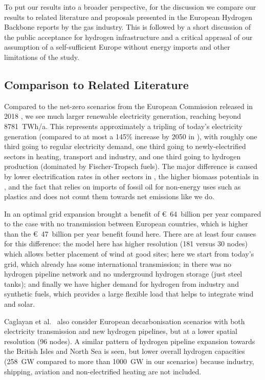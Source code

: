 To put our results into a broader perspective, for the discussion we compare our
results to related literature and proposals presented in the European Hydrogen
Backbone reports by the gas industry. This is followed by a short discussion of
the public acceptance for hydrogen infrastructure and a critical apprasal of our
assumption of a self-sufficient Europe without energy imports and other
limitations of the study.

\subsection*{Comparison to Related Literature}

Compared to the net-zero scenarios from the European Commission released in 2018
\cite{in-depth_2018}, we see much larger renewable electricity generation, reaching beyond
8781~TWh/a. This represents approximately a tripling
of today's electricity generation (compared to at most a 145\% increase by 2050
in \cite{in-depth_2018}), with roughly one third going to regular electricity
demand, one third going to newly-electrified sectors in heating, transport and
industry, and one third going to hydrogen production (dominated by
Fischer-Tropsch fuels). The major difference is caused by lower electrification
rates in other sectors in \cite{in-depth_2018}, the higher biomass potentials in
\cite{in-depth_2018}, and the fact that \cite{in-depth_2018} relies on imports
of fossil oil for non-energy uses such as plastics and does not count them
towards net emissions like we do.

In \cite{brownSynergiesSector2018} an optimal grid expansion brought a benefit
of \euro~64~billion per year compared to the case with no transmission between
European countries, which is higher than the \euro~47~billion per year benefit
found here. There are at least four causes for this difference: the model here
has higher resolution (181 versus 30 nodes) which allows better placement of
wind at good sites; here we start from today's grid, which already has some
international transmission; in \cite{brownSynergiesSector2018} there was no
hydrogen pipeline network and no underground hydrogen storage (just steel
tanks); and finally we have higher demand for hydrogen from industry and
synthetic fuels, which provides a large flexible load that helps to integrate
wind and solar.

Caglayan et al.~\cite{Caglayan2019} also consider European decarbonisation
scenarios with both electricity transmission and new hydrogen pipelines, but at
a lower spatial resolution (96 nodes). A similar pattern of hydrogen pipeline
expansion towards the British Isles and North Sea is seen, but lower overall
hydrogen capacities (258~GW compared to more than 1000~GW in our scenarios)
because industry, shipping, aviation and non-electrified heating are not
included.

